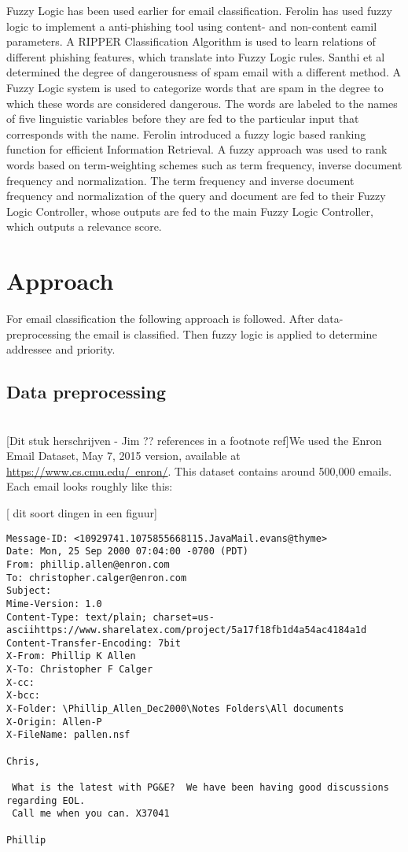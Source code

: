 \documentclass[journal]{IEEEtran}
\begin{document}
Fuzzy Logic has been used earlier for email classification. Ferolin \cite{phishing} 
has used fuzzy logic to implement a anti-phishing tool using content- and non-content eamil parameters. A RIPPER Classification Algorithm is used to learn relations of different phishing features, which translate into Fuzzy Logic rules. Santhi et al \cite{spam} determined the degree of dangerousness of spam email with a different method. A Fuzzy Logic system is used to categorize words that are spam in the degree to which these words are considered dangerous. The words are labeled to the names of five linguistic variables before they are fed to the particular input that corresponds with the name. Ferolin \cite{ranking} introduced a fuzzy logic based ranking function for efficient Information Retrieval. A fuzzy approach was used to rank words based on term-weighting schemes such as term frequency, inverse document frequency and normalization. The term frequency and inverse document frequency and normalization of the query and document are fed to their Fuzzy Logic Controller, whose outputs are fed to the main Fuzzy Logic Controller, which outputs a relevance score. \\

\section{Approach}
For email classification the following approach is followed. After data-preprocessing the email is classified. Then fuzzy logic is applied to determine addressee and priority. 

\subsection{Data preprocessing}\\

[Dit stuk herschrijven - Jim ?? references in a footnote ref]We used the Enron Email Dataset, May 7, 2015 version, available at 
\href{https://www.cs.cmu.edu/~enron/}{https://www.cs.cmu.edu/~enron/}. This 
dataset contains around 500,000 emails. Each email looks roughly like this:

[ dit soort dingen in een figuur]

\begin{lstlisting}
Message-ID: <10929741.1075855668115.JavaMail.evans@thyme>
Date: Mon, 25 Sep 2000 07:04:00 -0700 (PDT)
From: phillip.allen@enron.com
To: christopher.calger@enron.com
Subject: 
Mime-Version: 1.0
Content-Type: text/plain; charset=us-asciihttps://www.sharelatex.com/project/5a17f18fb1d4a54ac4184a1d
Content-Transfer-Encoding: 7bit
X-From: Phillip K Allen
X-To: Christopher F Calger
X-cc: 
X-bcc: 
X-Folder: \Phillip_Allen_Dec2000\Notes Folders\All documents
X-Origin: Allen-P
X-FileName: pallen.nsf

Chris,

 What is the latest with PG&E?  We have been having good discussions 
regarding EOL.
 Call me when you can. X37041

Phillip
\end{lstlisting}
\end{document}
